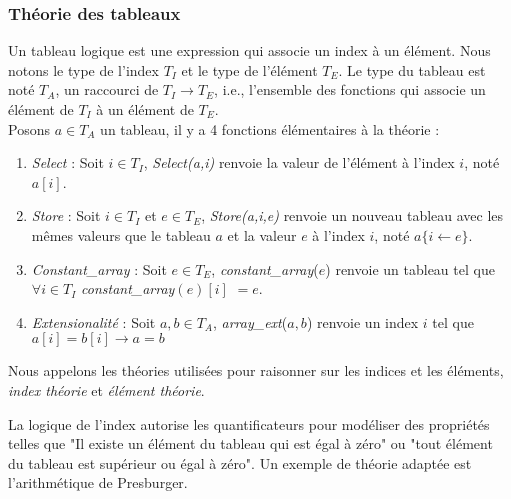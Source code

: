 \documentclass[11pt,openany]{article}
\begin{document}
		
		
		
		
		
	\subsubsection{Th\'eorie des tableaux}	
	Un tableau logique est une expression qui associe un index \`a un \'el\'ement. Nous notons le type de l'index $T_{I}$ et le type de l'\'el\'ement $T_{E}$. Le type du tableau est not\'e $T_{A}$, un raccourci de $T_{I}\rightarrow T_{E}$, i.e., l'ensemble des fonctions qui associe un \'el\'ement de $T_{I}$ \`a un \'el\'ement de $T_{E}$.\\
	Posons $a\in T_{A}$ un tableau, il y a 4 fonctions \'el\'ementaires \`a la th\'eorie :
	\begin{enumerate}
	\item \textit{Select} : Soit $i\in T_{I}$, \textit{Select(a,i)} renvoie la valeur de l'\'el\'ement \`a l'index $i$, not\'e $a[i]$.
	\item \textit{Store} :  Soit $i\in T_{I}$ et $e\in T_{E}$, \textit{Store(a,i,e)} renvoie un nouveau tableau avec les m\^emes valeurs que le tableau $a$ et la valeur $e$ \`a l'index $i$, not\'e $a\{i\leftarrow e\}$.
	\item \textit{Constant_array} : Soit $e\in T_{E}$, \textit{constant\_array}($e$) renvoie un tableau tel que $\forall i\in T_{I}$  \textit{constant\_array}$(e)[i]$ $= e$.
	\item \textit{Extensionalit\'e} : Soit $a,b\in T_{A}$, \textit{array_ext}($a,b$) renvoie un index $i$ tel que $a[i] = b[i]\rightarrow a = b $
	\end{enumerate}
	Nous appelons les th\'eories utilis\'ees pour raisonner sur les indices et les \'el\'ements, \textit{index th\'eorie} et \textit{\'el\'ement th\'eorie}.\par
La logique de l'index autorise les quantificateurs pour mod\'eliser des propri\'et\'es telles que "Il existe un \'el\'ement du tableau qui est \'egal \`a z\'ero" ou "tout \'el\'ement du tableau est sup\'erieur ou \'egal \`a z\'ero". Un exemple de th\'eorie adapt\'ee est l'arithm\'etique de Presburger.
	
\end{document}
